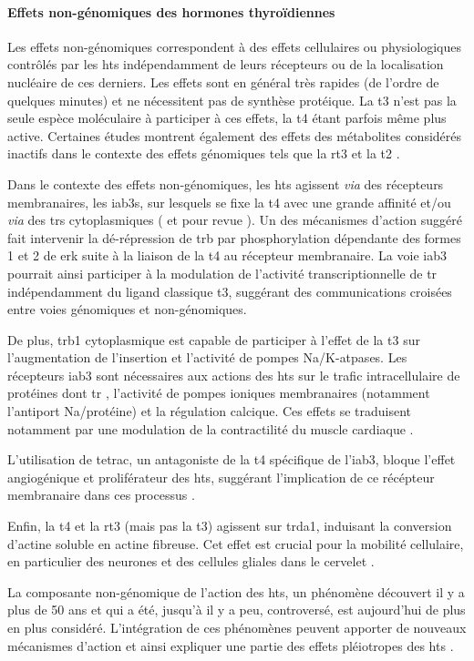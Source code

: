 \documentclass[../main.tex]{subfiles}
\begin{document}
\paragraph{Effets non-génomiques des hormones thyroïdiennes}
Les effets non-génomiques correspondent à des effets cellulaires ou physiologiques contrôlés par les \glspl{ht} indépendamment de leurs récepteurs ou de la localisation nucléaire de ces derniers.
Les effets sont en général très rapides (de l'ordre de quelques minutes) et ne nécessitent pas de synthèse protéique.
La \gls{t3} n'est pas la seule espèce moléculaire à participer à ces effets, la \gls{t4} étant parfois même plus active.
Certaines études montrent également des effets des métabolites considérés inactifs dans le contexte des effets génomiques tels que la \gls{rt3} \citep{Siegrist-Kaiser1990} et la \gls{t2} \citep{Lombardi1998}.
\par
Dans le contexte des effets non-génomiques, les \glspl{ht} agissent \textit{via} des récepteurs membranaires, les \glspl{iab3}, sur lesquels se fixe la \gls{t4} avec une grande affinité et/ou \textit{via} des \glspl{tr} cytoplasmiques (\citealp{Bergh2005} et pour revue \citealp{Davis2008}).
Un des mécanismes d'action suggéré fait intervenir la dé-répression de \gls{trb} par phosphorylation dépendante des formes 1 et 2 de \gls{erk} \citep{Davis2000} suite à la liaison de la \gls{t4} au récepteur membranaire.
La voie \gls{iab3} pourrait ainsi participer à la modulation de l'activité transcriptionnelle de \gls{tr} indépendamment du ligand classique \gls{t3}, suggérant des communications croisées entre voies génomiques et non-génomiques.
\par
De plus, \gls{trb}1 cytoplasmique est capable de participer à l'effet de la \gls{t3} sur l'augmentation de l'insertion et l'activité de pompes \gls{Na}/\gls{K}-\gls{atp}ases.
Les récepteurs \gls{iab3} sont nécessaires aux actions des \glspl{ht} sur le trafic intracellulaire de protéines dont \gls{tr} \citep{Davis2005}, l'activité de pompes ioniques membranaires (notamment l'antiport \gls{Na}/protéine) et la régulation calcique.
Ces effets se traduisent notamment par une modulation de la contractilité du muscle cardiaque \citep{Davis2002}.
\par
L'utilisation de \gls{tetrac}, un antagoniste de la \gls{t4} spécifique de l'\gls{iab3}, bloque l'effet angiogénique et proliférateur des \glspl{ht}, suggérant l'implication de ce récépteur membranaire dans ces processus \citep{Davis2011}.
\par
Enfin, la \gls{t4} et la \gls{rt3} (mais pas la \gls{t3}) agissent sur \gls{trda}1, induisant la conversion d'actine soluble en actine fibreuse.
Cet effet est crucial pour la mobilité cellulaire, en particulier des neurones et des cellules gliales dans le cervelet \citep{Safran1993,Leonard2006}.
\par
La composante non-génomique de l'action des \glspl{ht}, un phénomène découvert il y a plus de 50 ans et qui a été, jusqu'à il y a peu, controversé, est aujourd'hui de plus en plus considéré.
L'intégration de ces phénomènes peuvent apporter de nouveaux mécanismes d'action et ainsi expliquer une partie des effets pléiotropes des \glspl{ht} \citep{Brix2011}.
\end{document}
